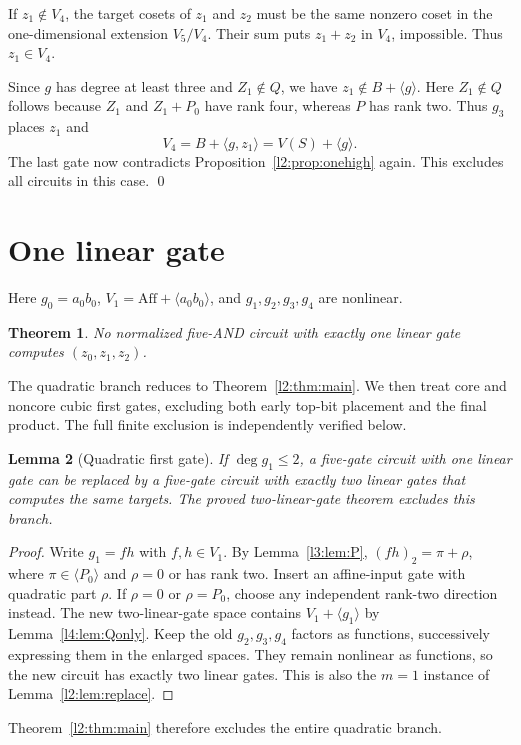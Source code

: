 \documentclass[11pt,a4paper]{article}
\theoremstyle{plain}
\newtheorem{theorem}{Theorem}
\newtheorem{lemma}[theorem]{Lemma}
\theoremstyle{remark}
\newcommand{\Aff}{\mathrm{Aff}}
\begin{document}
If $z_1\notin V_4$, the target cosets of $z_1$ and $z_2$ must be the same nonzero coset in the one-dimensional extension $V_5/V_4$. Their sum puts $z_1+z_2$ in $V_4$, impossible. Thus $z_1\in V_4$.

Since $g$ has degree at least three and $Z_1\notin Q$, we have $z_1\notin B+\langle g\rangle$. Here $Z_1\notin Q$ follows because $Z_1$ and $Z_1+P_0$ have rank four, whereas $P$ has rank two. Thus $g_3$ places $z_1$ and
\[
V_4=B+\langle g,z_1\rangle=V(S)+\langle g\rangle.
\]
The last gate now contradicts Proposition~\ref{l2:prop:onehigh} again. This excludes all circuits in this case. \qed

\section{One linear gate}\label{sec:lambda1}
Here $g_0=a_0b_0$, $V_1=\Aff+\langle a_0b_0\rangle$, and $g_1,g_2,g_3,g_4$ are nonlinear.

\begin{theorem}\label{l1:thm:main}
No normalized five-AND circuit with exactly one linear gate computes $(z_0,z_1,z_2)$.
\end{theorem}
The quadratic branch reduces to Theorem~\ref{l2:thm:main}. We then treat core and noncore cubic first gates, excluding both early top-bit placement and the final product. The full finite exclusion is independently verified below.

\begin{lemma}[Quadratic first gate]\label{l1:lem:reduce}
If $\deg g_1\le2$, a five-gate circuit with one linear gate can be replaced by a five-gate circuit with exactly two linear gates that computes the same targets. The proved two-linear-gate theorem excludes this branch.
\end{lemma}
\begin{proof}
Write $g_1=fh$ with $f,h\in V_1$. By Lemma~\ref{l3:lem:P}, $(fh)_2=\pi+\rho$, where $\pi\in\langle P_0\rangle$ and $\rho=0$ or has rank two. Insert an affine-input gate with quadratic part $\rho$. If $\rho=0$ or $\rho=P_0$, choose any independent rank-two direction instead. The new two-linear-gate space contains $V_1+\langle g_1\rangle$ by Lemma~\ref{l4:lem:Qonly}. Keep the old $g_2,g_3,g_4$ factors as functions, successively expressing them in the enlarged spaces. They remain nonlinear as functions, so the new circuit has exactly two linear gates. This is also the $m=1$ instance of Lemma~\ref{l2:lem:replace}.
\end{proof}
Theorem~\ref{l2:thm:main} therefore excludes the entire quadratic branch.
\end{document}
